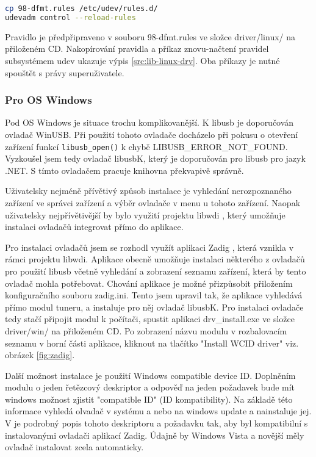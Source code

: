 \begin{lstlisting}[language=bash, label=src:lib-linux-drv, caption=Přídání udev pravidla.]
cp 98-dfmt.rules /etc/udev/rules.d/
udevadm control --reload-rules
\end{lstlisting}

Pravidlo je předpřipraveno v souboru 98-dfmt.rules ve složce driver/linux/ na přiloženém CD. Nakopírování pravidla a příkaz znovu-načtení pravidel subsystémem udev ukazuje výpis \ref{src:lib-linux-drv}. Oba příkazy je nutné spouštět s právy superuživatele.

\subsubsection{Pro OS Windows}
Pod OS Windows je situace trochu komplikovanější. K libusb je doporučován ovladač WinUSB. Při použití tohoto ovladače docházelo při pokusu o otevření zařízení funkcí \verb|libusb_open()| k chybě LIBUSB\_ERROR\_NOT\_FOUND. Vyzkoušel jsem tedy ovladač libusbK, který je doporučován pro libusb pro jazyk .NET. S tímto ovladačem pracuje knihovna překvapivě správně.

Uživatelsky nejméně přívětivý způsob instalace je vyhledání nerozpoznaného zařízení ve správci zařízení a výběr ovladače v menu u tohoto zařízení. Naopak uživatelsky nejpřívětivější by bylo využití projektu libwdi \cite{libwdi}, který umožňuje instalaci ovladačů integrovat přímo do aplikace.


Pro instalaci ovladačů jsem se rozhodl využít aplikaci Zadig \cite{zadig}, která vznikla v rámci projektu libwdi. Aplikace obecně umožňuje instalaci některého z ovladačů pro použití libusb včetně vyhledání a zobrazení seznamu zařízení, která by tento ovladač mohla potřebovat. Chování aplikace je možné přizpůsobit přiložením konfiguračního souboru zadig.ini. Tento jsem upravil tak, že aplikace vyhledává přímo modul tuneru, a instaluje pro něj ovladač libusbK. Pro instalaci ovladače tedy stačí připojit modul k počítači, spustit aplikaci drv\_install.exe ve složce driver/win/ na přiloženém CD. Po zobrazení názvu modulu v rozbalovacím seznamu v horní části aplikace, kliknout na tlačítko "Install WCID driver" viz. obrázek \ref{fig:zadig}.

Další možnost instalace je použití Windows compatible device ID. Doplněním modulu o jeden řetězcový deskriptor a odpověď na jeden požadavek bude mít windows možnost zjistit "compatible ID" (ID kompatibility). Na základě této informace vyhledá olvadač v systému a nebo na windows update a nainstaluje jej. V \cite{wcid} je   podrobný popis tohoto deskriptoru a požadavku tak, aby byl kompatibilní s instalovanými ovladači aplikací Zadig. Údajně by Windows Vista a novější měly ovladač instalovat zcela automaticky. 

